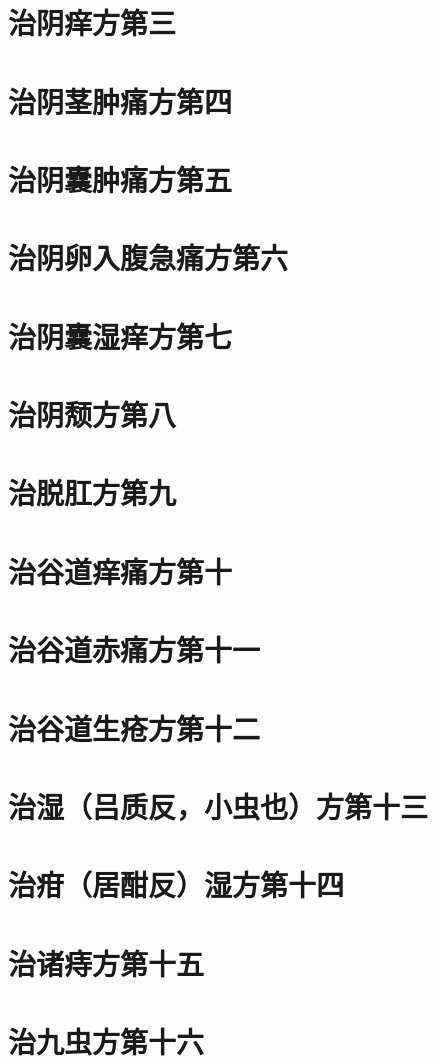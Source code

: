 \documentclass[a4paper,12pt,UTF8,twoside]{ctexbook}
\begin{document}
\chapter{治阴痒方第三}
\chapter{治阴茎肿痛方第四}
\chapter{治阴囊肿痛方第五}
\chapter{治阴卵入腹急痛方第六}
\chapter{治阴囊湿痒方第七}
\chapter{治阴颓方第八}
\chapter{治脱肛方第九}
\chapter{治谷道痒痛方第十}
\chapter{治谷道赤痛方第十一}
\chapter{治谷道生疮方第十二}
\chapter{治湿（吕质反，小虫也）方第十三}
\chapter{治疳（居酣反）湿方第十四}
\chapter{治诸痔方第十五}
\chapter{治九虫方第十六}
\end{document}
